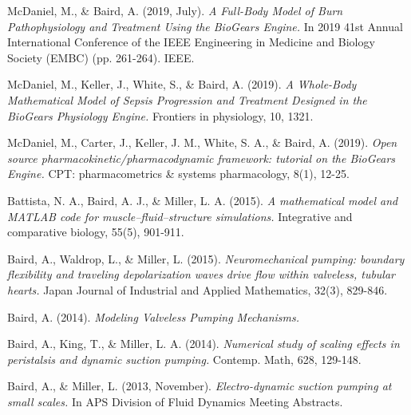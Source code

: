 
\begin{cventries}
  \cventry
    {} %
    {} %
    {} %
    {} %
    {
      \begin{cvitems} %
        \item {McDaniel, M., \& Baird, A. (2019, July). \textit{A Full-Body Model of Burn Pathophysiology and Treatment Using the BioGears Engine.} In 2019 41st Annual International Conference of the IEEE Engineering in Medicine and Biology Society (EMBC) (pp. 261-264). IEEE.}
        \item {McDaniel, M., Keller, J., White, S., \& Baird, A. (2019). \textit{A Whole-Body Mathematical Model of Sepsis Progression and Treatment Designed in the BioGears Physiology Engine.} Frontiers in physiology, 10, 1321.}
        \item{McDaniel, M., Carter, J., Keller, J. M., White, S. A., \& Baird, A. (2019). \textit{Open source pharmacokinetic/pharmacodynamic framework: tutorial on the BioGears Engine.} CPT: pharmacometrics \& systems pharmacology, 8(1), 12-25.}
        \item{Battista, N. A., Baird, A. J., \& Miller, L. A. (2015). \textit{A mathematical model and MATLAB code for muscle–fluid–structure simulations.} Integrative and comparative biology, 55(5), 901-911.}
        \item{Baird, A., Waldrop, L., \& Miller, L. (2015). \textit{Neuromechanical pumping: boundary flexibility and traveling depolarization waves drive flow within valveless, tubular hearts.} Japan Journal of Industrial and Applied Mathematics, 32(3), 829-846.}
        \item{ Baird, A. (2014). \textit{Modeling Valveless Pumping Mechanisms.}}
        \item{ Baird, A., King, T., \& Miller, L. A. (2014). \textit{Numerical study of scaling effects in peristalsis and dynamic suction pumping.} Contemp. Math, 628, 129-148.}
        \item{Baird, A., \& Miller, L. (2013, November). \textit{Electro-dynamic suction pumping at small scales.} In APS Division of Fluid Dynamics Meeting Abstracts.}
      \end{cvitems}
    }
\end{cventries}
\pagebreak